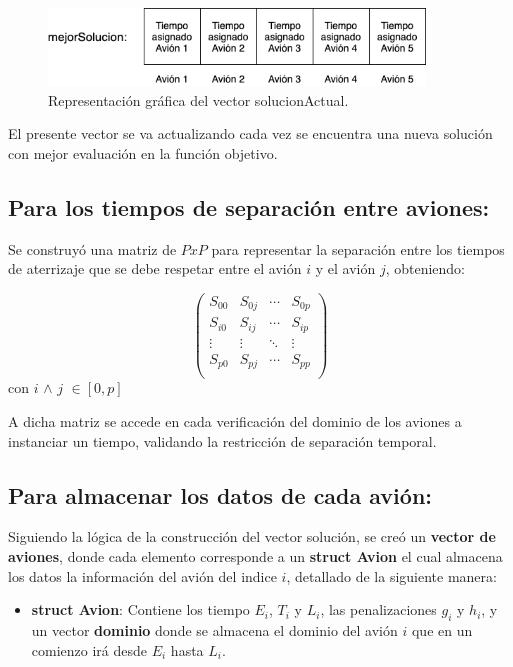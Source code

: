 \documentclass[letter, 10pt]{article}
\begin{document}
\begin{figure}[h]
    \centering
    \includegraphics[width=10cm]{solucionVector.png}
    \caption{Representación gráfica del vector solucionActual.}
    \label{fig:vectorSolucion}
\end{figure}

El presente vector se va actualizando cada vez se encuentra una nueva solución con mejor evaluación en la función objetivo.

\subsection{Para los tiempos de separación entre aviones:}
Se construyó una matriz de $PxP$ para representar la separación entre los tiempos de aterrizaje que se debe respetar entre el avión $i$ y el avión $j$, obteniendo:
\begin{center}
    \begin{equation*}
    \begin{pmatrix}
    S_{00} & S_{0j} & \cdots & S_{0p}\\
    S_{i0} & S_{ij} & \cdots & S_{ip}\\
    \vdots & \vdots & \ddots & \vdots\\
    S_{p0} & S_{pj} & \cdots & S_{pp}\\
    \end{pmatrix}
\end{equation*}
con   $i$ $\wedge$ $j$ $\in [0,p]$
\end{center}

A dicha matriz se accede en cada verificación del dominio de los aviones a instanciar un tiempo, validando la restricción de separación temporal.\\

\subsection{Para almacenar los datos de cada avión:}
Siguiendo la lógica de la construcción del vector solución, se creó un \textbf{vector de aviones}, donde cada elemento corresponde a un \textbf{struct Avion} el cual almacena los datos la información del avión del indice $i$, detallado de la siguiente manera:
\begin{itemize}
    \item \textbf{struct Avion}: Contiene los tiempo $E_i$, $T_i$ y $L_i$, las penalizaciones $g_i$ y $h_i$, y un vector \textbf{dominio} donde se almacena el dominio del avión $i$ que en un comienzo irá desde $E_i$ hasta $L_i$.

\end{itemize}
\end{document}

